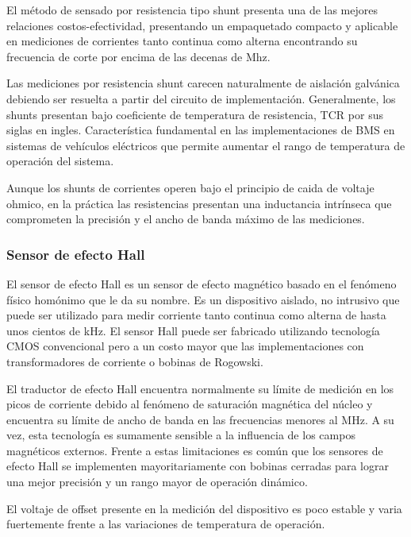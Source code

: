\documentclass[10pt,a4paper]{article}
\begin{document}
	\noindent El método de sensado por resistencia tipo shunt presenta una de 
    las mejores relaciones costos-efectividad, presentando un empaquetado 
    compacto y aplicable en mediciones de corrientes tanto continua como alterna 
    encontrando su frecuencia de corte por encima de las decenas de Mhz.
	
	\noindent Las mediciones por resistencia shunt carecen naturalmente de 
    aislación galvánica debiendo ser resuelta a partir del circuito de 
    implementación. Generalmente, los shunts presentan bajo coeficiente de 
    temperatura de resistencia, TCR por sus siglas en ingles. 
    Característica fundamental en las implementaciones de BMS en sistemas de 
    vehículos eléctricos que permite aumentar el rango de temperatura de 
    operación del sistema.
	
	\noindent Aunque los shunts de corrientes operen bajo el principio de caida 
    de voltaje ohmico, en la práctica las resistencias presentan una inductancia 
    intrínseca que comprometen la precisión y el ancho de banda máximo de las 
    mediciones.
	
	\subsubsection{Sensor de efecto Hall}

	El sensor de efecto Hall es un sensor de efecto magnético basado en 
    el fenómeno físico homónimo que le da su nombre. Es un dispositivo aislado, 
    no intrusivo que puede ser utilizado para medir corriente tanto continua 
    como alterna de hasta unos cientos de kHz. El sensor Hall puede ser fabricado 
    utilizando tecnología CMOS convencional pero a un costo mayor que las 
    implementaciones con transformadores de corriente o bobinas de Rogowski.
	
	\noindent El traductor de efecto Hall encuentra normalmente su límite de 
    medición en los picos de corriente debido al fenómeno de saturación 
    magnética del núcleo y encuentra su límite de ancho de banda en las 
    frecuencias menores al MHz. A su vez, esta tecnología es sumamente sensible 
    a la influencia de los campos magnéticos externos. Frente a estas 
    limitaciones es común que los sensores de efecto Hall se implementen 
    mayoritariamente con bobinas cerradas para lograr una mejor precisión y un 
    rango mayor de operación dinámico.
	
	El voltaje de offset presente en la medición del dispositivo es poco estable 
    y varia fuertemente frente a las variaciones de temperatura de operación.
	
\end{document}
